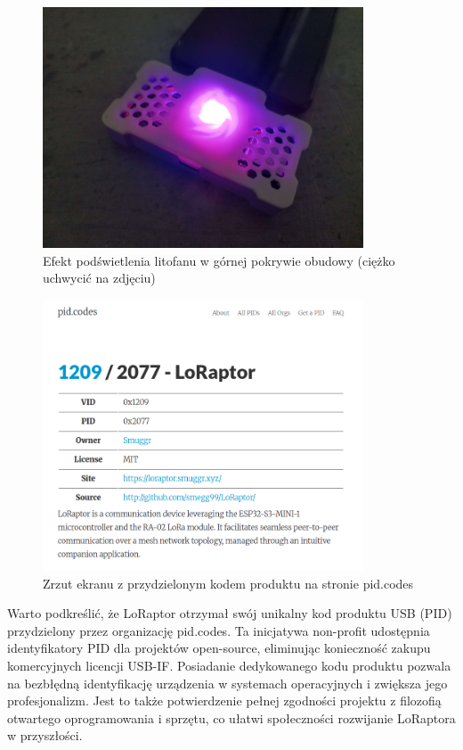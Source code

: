 \begin{figure}[htbp]
	\centering
	\includegraphics[width=0.85\textwidth]{root/litophane_test.jpg}
	\caption{Efekt podświetlenia litofanu w górnej pokrywie obudowy (ciężko uchwycić na zdjęciu)}
\end{figure}

\clearpage
\begin{figure}[htbp]
\centering
	\includegraphics[width=0.85\textwidth]{root/pid_code.png}
	\caption{Zrzut ekranu z przydzielonym kodem produktu na stronie pid.codes}
\end{figure}

Warto podkreślić, że LoRaptor otrzymał swój unikalny kod produktu USB (PID) przydzielony przez organizację pid.codes. Ta inicjatywa non-profit udostępnia identyfikatory PID dla projektów open-source, eliminując konieczność zakupu komercyjnych licencji USB-IF. Posiadanie dedykowanego kodu produktu pozwala na bezbłędną identyfikację urządzenia w systemach operacyjnych i zwiększa jego profesjonalizm. Jest to także potwierdzenie pełnej zgodności projektu z filozofią otwartego oprogramowania i sprzętu, co ułatwi społeczności rozwijanie LoRaptora w przyszłości.

